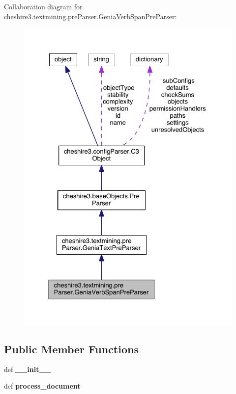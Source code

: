 Collaboration diagram for cheshire3.\-textmining.\-pre\-Parser.\-Genia\-Verb\-Span\-Pre\-Parser\-:
\nopagebreak
\begin{figure}[H]
\begin{center}
\leavevmode
\includegraphics[width=326pt]{classcheshire3_1_1textmining_1_1pre_parser_1_1_genia_verb_span_pre_parser__coll__graph}
\end{center}
\end{figure}
\subsection*{Public Member Functions}
\begin{DoxyCompactItemize}
\item 
\hypertarget{classcheshire3_1_1textmining_1_1pre_parser_1_1_genia_verb_span_pre_parser_ae10ccbc11cad698b77ad03537445147a}{def {\bfseries \-\_\-\-\_\-init\-\_\-\-\_\-}}\label{classcheshire3_1_1textmining_1_1pre_parser_1_1_genia_verb_span_pre_parser_ae10ccbc11cad698b77ad03537445147a}

\item 
\hypertarget{classcheshire3_1_1textmining_1_1pre_parser_1_1_genia_verb_span_pre_parser_ab56b4a6ccc64ec262654eeac74ed90a5}{def {\bfseries process\-\_\-document}}\label{classcheshire3_1_1textmining_1_1pre_parser_1_1_genia_verb_span_pre_parser_ab56b4a6ccc64ec262654eeac74ed90a5}

\end{DoxyCompactItemize}
